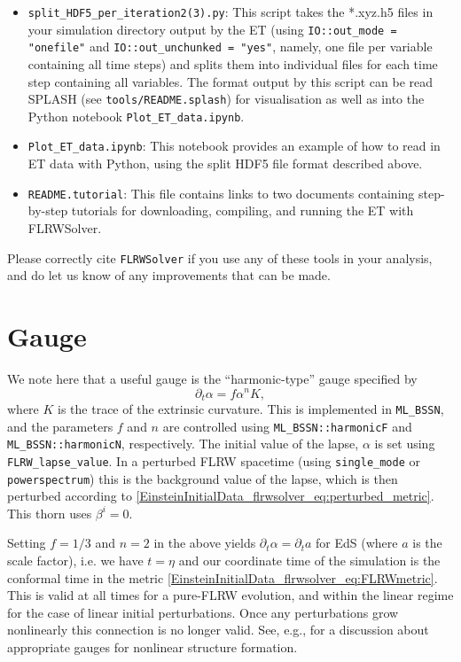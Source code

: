 \begin{itemize}
\item \texttt{split\_HDF5\_per\_iteration2(3).py}: This script takes the *.xyz.h5 files in your simulation directory output by the ET (using \texttt{IO::out\_mode = "onefile"} and \texttt{IO::out\_unchunked = "yes"}, namely, one file per variable containing all time steps) and splits them into individual files for each time step containing all variables. The format output by this script can be read SPLASH (see \texttt{tools/README.splash}) for visualisation as well as into the Python notebook \texttt{Plot\_ET\_data.ipynb}.

\item \texttt{Plot\_ET\_data.ipynb}: This notebook provides an example of how to read in ET data with Python, using the split HDF5 file format described above.

\item \texttt{README.tutorial}: This file contains links to two documents containing step-by-step tutorials for downloading, compiling, and running the ET with FLRWSolver. 

\end{itemize}
Please correctly cite \texttt{FLRWSolver} if you use any of these tools in your analysis, and do let us know of any improvements that can be made. 


\section{Gauge}
\label{EinsteinInitialData_flrwsolver_sec:gauge}

We note here that a useful gauge is the ``harmonic-type'' gauge specified by
\begin{equation}
	\partial_t \alpha = f \alpha^n K,
\end{equation}
where $K$ is the trace of the extrinsic curvature. This is implemented in \texttt{ML\_BSSN}, and the parameters $f$ and $n$ are controlled using \texttt{ML\_BSSN::harmonicF} and \texttt{ML\_BSSN::harmonicN}, respectively. The initial value of the lapse, $\alpha$ is set using \texttt{FLRW\_lapse\_value}. In a perturbed FLRW spacetime (using {\tt single\_mode} or {\tt powerspectrum}) this is the background value of the lapse, which is then perturbed according to \eqref{EinsteinInitialData_flrwsolver_eq:perturbed_metric}. This thorn uses $\beta^i=0$.

Setting $f=1/3$ and $n=2$ in the above yields $\partial_t \alpha = \partial_t a$ for EdS (where $a$ is the scale factor), i.e. we have $t=\eta$ and our coordinate time of the simulation is the conformal time in the metric \eqref{EinsteinInitialData_flrwsolver_eq:FLRWmetric}. This is valid at all times for a pure-FLRW evolution, and within the linear regime for the case of linear initial perturbations. Once any perturbations grow nonlinearly this connection is no longer valid. See, e.g., \cite{EinsteinInitialData_flrwsolver_macpherson2019} for a discussion about appropriate gauges for nonlinear structure formation. 



